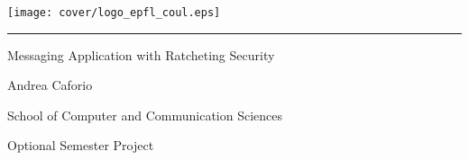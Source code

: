
%        




\newcommand{\logoepfl}[0]{
  \begin{center}
    \texttt{[image: cover/logo\_epfl\_coul.eps]}
  \end{center}
  \vspace{0.3cm}
  \hrule
}
\newcommand{\logolasec}[0]{
  \vspace{1cm}
  \hrule
  \begin{center}
    \texttt{[image: cover/logo\_lasec\_coul.eps]}
  \end{center}
}
\newcommand{\project}[1]{
  \begin{center}
    \large{#1}
  \end{center}
  \vspace{1cm}
}
\newcommand{\department}[1]{
  \begin{center}
    \large{#1}
  \end{center}
}
\newcommand{\supervisor}[3]{
  \begin{center}
    \begin{normalsize}{
        \bfseries #1}\\#2\\#3
    \end{normalsize}
  \end{center}
}
\renewcommand{\author}[1]{
  \begin{center}
    \Large{#1}
  \end{center}
  \vspace{0.5cm}
}
\renewcommand{\title}[1]{
  \vspace{3cm}
  \begin{center}
    \huge{#1}
  \end{center}
  \vspace{1.7cm}
}
\renewcommand{\date}[2]{
  \begin{center}
    \normalsize{#1 #2}
  \end{center}
  \vspace{0.5cm}
}


\thispagestyle{empty}


\logoepfl

\title{Messaging Application with Ratcheting Security}

\author{Andrea Caforio}
\department{School of Computer and Communication Sciences}
\project{Optional Semester Project}


